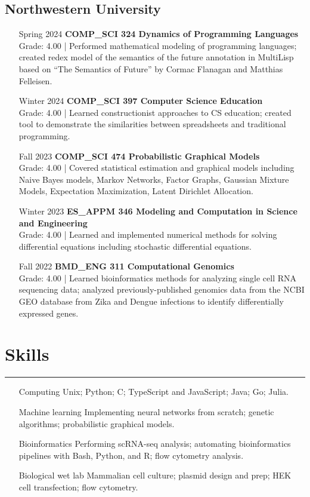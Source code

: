 \documentclass{article}
\begin{document}
\subsection*{Northwestern University}

\begin{itemize}[leftmargin=1.5in]
    \item[Spring 2024] \textbf{COMP\_SCI 324 Dynamics of Programming Languages}\\
    Grade: 4.00 | Performed mathematical modeling of programming languages; created redex model of the semantics of the future annotation in MultiLisp based on ``The Semantics of Future'' by Cormac Flanagan and Matthias Felleisen.
    \item[Winter 2024] \textbf{COMP\_SCI 397 Computer Science Education}\\
    Grade: 4.00 | Learned constructionist approaches to CS education; created tool to demonstrate the similarities between spreadsheets and traditional programming.
    \item[Fall 2023] \textbf{COMP\_SCI 474 Probabilistic Graphical Models}\\
    Grade: 4.00 | Covered statistical estimation and graphical models including Naive Bayes models, Markov Networks, Factor Graphs, Gaussian Mixture Models, Expectation Maximization, Latent Dirichlet Allocation.
    \item[Winter 2023] \textbf{ES\_APPM 346 Modeling and Computation in Science and Engineering}\\
    Grade: 4.00 | Learned and implemented numerical methods for solving differential equations including stochastic differential equations.
    \item[Fall 2022] \textbf{BMD\_ENG 311 Computational Genomics}\\
    Grade: 4.00 | Learned bioinformatics methods for analyzing single cell RNA sequencing data; analyzed previously-published genomics data from the NCBI GEO database from Zika and Dengue infections to identify differentially expressed genes.
\end{itemize}

\section*{Skills}
\hrule
\vspace{10pt}

\begin{itemize}[leftmargin=1.5in]
    \item[Computing] Unix; Python; C; TypeScript and JavaScript; Java; Go; Julia.
    \item[Machine learning] Implementing neural networks from scratch; genetic algorithms; probabilistic graphical models.
    \item[Bioinformatics] Performing scRNA-seq analysis; automating bioinformatics pipelines with Bash, Python, and R; flow cytometry analysis.
    \item[Biological wet lab] Mammalian cell culture; plasmid design and prep; HEK cell transfection; flow cytometry.
\end{itemize}
\end{document}
